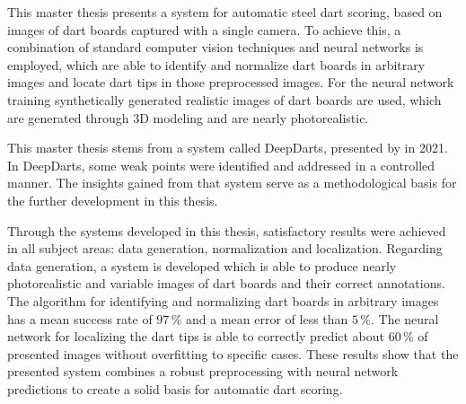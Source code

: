 \vspace*{1.405cm}

\noindent This master thesis presents a system for automatic steel dart scoring, based on images of dart boards captured with a single camera. To achieve this, a combination of standard computer vision techniques and neural networks is employed, which are able to identify and normalize dart boards in arbitrary images and locate dart tips in those preprocessed images. For the neural network training synthetically generated realistic images of dart boards are used, which are generated through 3D modeling and are nearly photorealistic.

This master thesis stems from a system called DeepDarts, presented by \citeauthor{deepdarts} in 2021. In DeepDarts, some weak points were identified and addressed in a controlled manner. The insights gained from that system serve as a methodological basis for the further development in this thesis.

Through the systems developed in this thesis, satisfactory results were achieved in all subject areas: data generation, normalization and localization. Regarding data generation, a system is developed which is able to produce nearly photorealistic and variable images of dart boards and their correct annotations. The algorithm for identifying and normalizing dart boards in arbitrary images has a mean success rate of $97\,\%$ and a mean error of less than $5\,\%$. The neural network for localizing the dart tips is able to correctly predict about $60\,\%$ of presented images without overfitting to specific cases. These results show that the presented system combines a robust preprocessing with neural network predictions to create a solid basis for automatic dart scoring.
